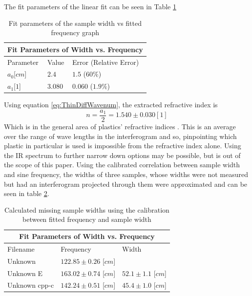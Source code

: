 \documentclass[reprint,amsmath,amssymb,aps, prl]{revtex4-2}
\begin{document}
The fit parameters of the linear fit can be seen in Table \ref{tbl:WidthFit}
\begin{table}[h]
    \begin{tabular}{ |p{2cm}|p{2cm}|p{3.3cm}|  }
     \hline
     \multicolumn{3}{|c|}{Fit Parameters of Width vs. Frequency} \\ \hline
     Parameter & Value & Error (Relative Error)\\ \hline
     $a_{0}$[$cm$]  &$2.4$      &$1.5$ ($60\%$) \\ 
     $a_{1}$[$1$]   &$3.080$    &$0.060$ ($1.9\%$)  \\ \hline
    \end{tabular}
    \caption{Fit parameters of the sample width vs fitted frequency graph}
    \label{tbl:WidthFit}
\end{table}

Using equation \ref{eq:ThinDiffWavenum}, the extracted refractive index is
\begin{equation}
    n = \frac{a_1}{2} = 1.540 \pm 0.030 [1]
\end{equation}
Which is in the general area of plastics' refractive indices \cite{plasticRefract}. This is an average over the range of wave lengths in the interferogram and so, pinpointing which plastic in particular is used is impossible from the refractive index alone. Using the IR spectrum to further narrow down options may be possible, but is out of the scope of this paper.
Using the calibrated correlation between sample width and sine frequency, the widths of three samples, whose widths were not measured but had an interferogram projected through them were approximated and can be seen in table \ref{tbl:ThinMissingWidths}.
\begin{table}[h]
    \begin{tabular}{ |p{2.3cm}|p{3cm}|p{3cm}|  }
     \hline
     \multicolumn{3}{|c|}{Fit Parameters of Width vs. Frequency} \\ \hline
     Filename & Frequency & Width\\ \hline
     Unknown  &$122.85\pm0.26$ [$cm$]      &\\ 
     Unknown E &$163.02\pm0.74$ [$cm$]      &$52.1\pm1.1$ [$cm$]\\ 
     Unknown cpp-c&$142.24\pm0.51$ [$cm$]      &$45.4\pm1.0$ [$cm$]\\ \hline
    \end{tabular}
    \caption{Calculated missing sample widths using the calibration between fitted frequency and sample width}
    \label{tbl:ThinMissingWidths}
\end{table}
\end{document}
